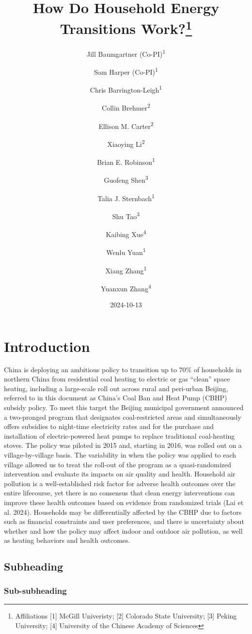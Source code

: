 \documentclass[
  letterpaper,
  DIV=11,
  numbers=noendperiod]{scrartcl}
\title{How Do Household Energy Transitions Work?\thanks{Affiliations
{[}1{]} McGill Univeristy; {[}2{]} Colorado State University; {[}3{]}
Peking University; {[}4{]} University of the Chinese Academy of
Sciences}}
\author{Jill Baumgartner (Co-PI)\textsuperscript{1} \and Sam Harper
(Co-PI)\textsuperscript{1} \and Chris
Barrington-Leigh\textsuperscript{1} \and Collin
Brehmer\textsuperscript{2} \and Ellison M.
Carter\textsuperscript{2} \and Xiaoying Li\textsuperscript{2} \and Brian
E. Robinson\textsuperscript{1} \and Guofeng
Shen\textsuperscript{3} \and Talia J.
Sternbach\textsuperscript{1} \and Shu
Tao\textsuperscript{3} \and Kaibing Xue\textsuperscript{4} \and Wenlu
Yuan\textsuperscript{1} \and Xiang Zhang\textsuperscript{1} \and Yuanxun
Zhang\textsuperscript{4}}
\date{2024-10-13}
\renewcommand*\contentsname{Table of contents}
\newcommand\contentsname{Table of contents}
\begin{document}
\maketitle

\renewcommand*\contentsname{Table of contents}
{
\hypersetup{linkcolor=}
\setcounter{tocdepth}{3}
\tableofcontents
}

\newpage

\section{Introduction}\label{introduction}

China is deploying an ambitious policy to transition up to 70\% of
households in northern China from residential coal heating to electric
or gas ``clean'' space heating, including a large-scale roll out across
rural and peri-urban Beijing, referred to in this document as China's
Coal Ban and Heat Pump (CBHP) subsidy policy. To meet this target the
Beijing municipal government announced a two-pronged program that
designates coal-restricted areas and simultaneously offers subsidies to
night-time electricity rates and for the purchase and installation of
electric-powered heat pumps to replace traditional coal-heating stoves.
The policy was piloted in 2015 and, starting in 2016, was rolled out on
a village-by-village basis. The variability in when the policy was
applied to each village allowed us to treat the roll-out of the program
as a quasi-randomized intervention and evaluate its impacts on air
quality and health. Household air pollution is a well-established risk
factor for adverse health outcomes over the entire lifecourse, yet there
is no consensus that clean energy interventions can improve these health
outcomes based on evidence from randomized trials (Lai et al. 2024).
Households may be differentially affected by the CBHP due to factors
such as financial constraints and user preferences, and there is
uncertainty about whether and how the policy may affect indoor and
outdoor air pollution, as well as heating behaviors and health outcomes.

\subsection{Subheading}\label{subheading}

\subsubsection{Sub-subheading}\label{sub-subheading}
\end{document}
